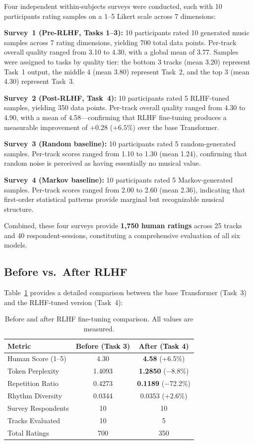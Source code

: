 \documentclass[conference]{IEEEtran}
\begin{document}
Four independent within-subjects surveys were conducted, each with 10 participants rating samples on a 1--5 Likert scale across 7 dimensions:

\textbf{Survey~1 (Pre-RLHF, Tasks 1--3):} 10 participants rated 10 generated music samples across 7 rating dimensions, yielding 700 total data points. Per-track overall quality ranged from 3.10 to 4.30, with a global mean of 3.77. Samples were assigned to tasks by quality tier: the bottom 3 tracks (mean 3.20) represent Task~1 output, the middle 4 (mean 3.80) represent Task~2, and the top 3 (mean 4.30) represent Task~3.

\textbf{Survey~2 (Post-RLHF, Task~4):} 10 participants rated 5 RLHF-tuned samples, yielding 350 data points. Per-track overall quality ranged from 4.30 to 4.90, with a mean of 4.58---confirming that RLHF fine-tuning produces a measurable improvement of $+0.28$ ($+6.5\%$) over the base Transformer.

\textbf{Survey~3 (Random baseline):} 10 participants rated 5 random-generated samples. Per-track scores ranged from 1.10 to 1.30 (mean 1.24), confirming that random noise is perceived as having essentially no musical value.

\textbf{Survey~4 (Markov baseline):} 10 participants rated 5 Markov-generated samples. Per-track scores ranged from 2.00 to 2.60 (mean 2.36), indicating that first-order statistical patterns provide marginal but recognizable musical structure.

Combined, these four surveys provide \textbf{1,750 human ratings} across 25 tracks and 40 respondent-sessions, constituting a comprehensive evaluation of all six models.

\subsection{Before vs.\ After RLHF}

Table~\ref{tab:rlhf} provides a detailed comparison between the base Transformer (Task~3) and the RLHF-tuned version (Task~4):

\begin{table}[h]
\caption{Before and after RLHF fine-tuning comparison. All values are measured.}
\label{tab:rlhf}
\centering\small
\begin{tabular}{lcc}
\toprule
Metric & Before (Task 3) & After (Task 4) \\
\midrule
Human Score (1--5) & 4.30 & \textbf{4.58} (+6.5\%) \\
Token Perplexity & 1.4093 & \textbf{1.2850} ($-$8.8\%) \\
Repetition Ratio & 0.4273 & \textbf{0.1189} ($-$72.2\%) \\
Rhythm Diversity & 0.0344 & 0.0353 (+2.6\%) \\
\midrule
Survey Respondents & 10 & 10 \\
Tracks Evaluated & 10 & 5 \\
Total Ratings & 700 & 350 \\
\bottomrule
\end{tabular}
\end{table}
\end{document}
